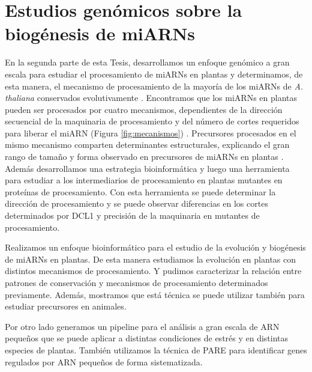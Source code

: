 

\section{Estudios genómicos sobre la biogénesis de miARNs}

En la segunda parte de esta Tesis, desarrollamos un enfoque genómico a gran escala para estudiar el procesamiento de miARNs en plantas y determinamos, de esta manera, el mecanismo de procesamiento de la mayoría de los miARNs de \textit{A. thaliana} conservados evolutivamente \citep{Bologna2013}.
Encontramos que los miARNs en plantas pueden ser procesados por cuatro mecanismos, dependientes de la dirección secuencial de la maquinaria de procesamiento y del número de cortes requeridos para liberar el miARN (Figura \ref{fig:mecanismos}) \citep{Bologna2013}.
Precursores procesados en el mismo mecanismo comparten determinantes estructurales, explicando el gran rango de tamaño y forma observado en precursores de miARNs en plantas \citep{Bologna2013}.
Además desarrollamos una estrategia bioinformática y luego una herramienta para estudiar a los intermediarios de procesamiento en plantas mutantes en proteínas de procesamiento.
Con esta herramienta se puede determinar la dirección de procesamiento y se puede observar diferencias en los cortes determinados por DCL1 y precisión de la maquinaria en mutantes de procesamiento.

Realizamos un  enfoque bioinformático para el estudio de la evolución y biogénesis de miARNs en plantas.
De esta manera estudiamos la evolución en plantas con distintos mecanismos de procesamiento.
Y pudimos caracterizar la relación entre patrones de conservación y mecanismos de procesamiento determinados previamente. 
Además, mostramos que está técnica se puede utilizar también para estudiar precursores en animales.

Por otro lado generamos un pipeline para el análisis a gran escala de ARN pequeños que se puede aplicar a distintas condiciones de estrés y en distintas especies de plantas.
También utilizamos la técnica de PARE para identificar genes regulados por ARN pequeños de forma sistematizada.


